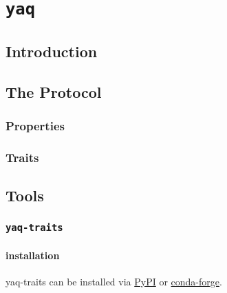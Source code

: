 \chapter{\texttt{yaq}} \label{cha:yaq}

\clearpage

\section{Introduction}  %

\clearpage

\section{The \yaq Protocol}  %


\subsection{Properties}

\subsection{Traits}

\clearpage

\section{Tools}

\subsection{\texttt{yaq-traits}}

\hypertarget{installation}{%
\subsubsection{installation}\label{installation}}

yaq-traits can be installed via
\href{https://pypi.org/project/yaq-traits/}{PyPI} or
\href{https://anaconda.org/conda-forge/yaq-traits}{conda-forge}.


